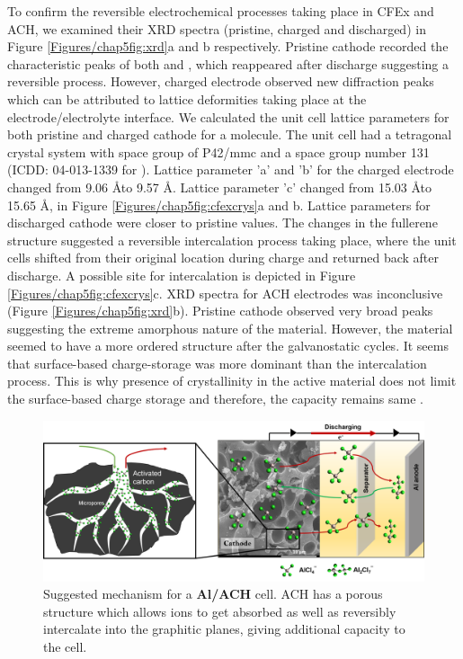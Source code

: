To confirm the reversible electrochemical processes taking place in CFEx and ACH, we examined their XRD spectra (pristine, charged and discharged) in Figure \ref{Figures/chap5fig:xrd}a and b respectively. Pristine cathode recorded the characteristic peaks of both  and , which reappeared after discharge suggesting a reversible process. However, charged electrode observed new diffraction peaks which can be attributed to lattice deformities taking place at the electrode/electrolyte interface. We calculated the unit cell lattice parameters for both pristine and charged cathode for a  molecule. The unit cell had a tetragonal crystal system with space group of P42/mmc and a space group number 131 (ICDD: 04-013-1339 for ). Lattice parameter 'a' and 'b' for the charged electrode changed from 9.06 \AA to 9.57 \AA . Lattice parameter 'c' changed from 15.03 \AA to 15.65 \AA, in Figure \ref{Figures/chap5fig:cfexcrys}a and b. Lattice parameters for discharged cathode were closer to pristine values. The changes in the fullerene structure suggested a reversible intercalation process taking place, where the unit cells shifted from their original location during charge and returned back after discharge. A possible site for  intercalation is depicted in Figure \ref{Figures/chap5fig:cfexcrys}c. XRD spectra for ACH electrodes was inconclusive (Figure \ref{Figures/chap5fig:xrd}b). Pristine cathode observed very broad peaks suggesting the extreme amorphous nature of the material. However, the material seemed to have a more ordered structure after the galvanostatic cycles. It seems that surface-based charge-storage was more dominant than the intercalation process. This is why presence of crystallinity in the active material does not limit the surface-based charge storage and therefore, the capacity remains same \cite{kim_synthesis_2006, jow_factors_2018}. 
 \begin{figure}[tbh!]
  \centering
  \includegraphics[width=\textwidth]{Figures/chap5fig/achmech}
    \caption{Suggested mechanism for a \textbf{Al/ACH} cell. ACH has a porous structure which allows  ions to get absorbed as well as reversibly intercalate into the graphitic planes, giving additional capacity to the cell.}
  \label{Figures/chap5fig:achmech}
\end{figure}


